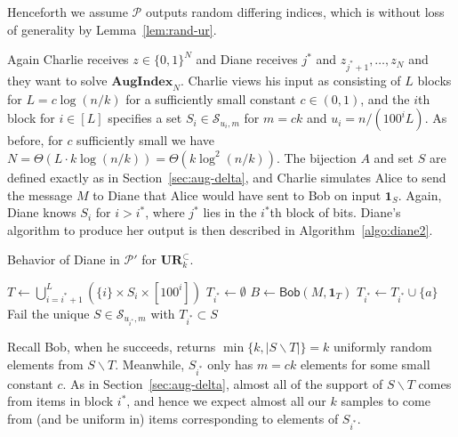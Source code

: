 \documentclass[11pt]{article}
\newcommand{\diane}{\mathsf{Diane}}
\newcommand{\query}{\mathsf{Bob}}
\newcommand{\aug}{\mathbf{AugIndex}\xspace}
\newcommand{\ur}{\mathbf{UR}\xspace}
\begin{document}
Henceforth we assume $\mathcal P$ outputs random differing indices, which is without loss of generality by Lemma~\ref{lem:rand-ur}.


Again Charlie receives $z\in\{0,1\}^N$ and Diane receives $j^*$ and $z_{j^*+1},\ldots,z_N$ and they want to solve $\aug_N$. Charlie views his input as consisting of $L$ blocks for $L = c\log(n/k)$ for a sufficiently small constant $c\in(0,1)$, and the $i$th block for $i\in[L]$ specifies a set $S_i \in \mathcal S_{u_i,m}$ for $m = ck$ and $u_i = n/(100^i L)$. As before, for $c$ sufficiently small we have $N = \Theta(L\cdot k\log(n/k)) = \Theta(k\log^2(n/k))$. The bijection $A$ and set $S$ are defined exactly as in Section~\ref{sec:aug-delta}, and Charlie simulates Alice to send the message $M$ to Diane that Alice would have sent to Bob on input $\mathbf{1}_S$. Again, Diane knows $S_i$ for $i>i^*$, where $j^*$ lies in the $i^*$th block of bits. Diane's algorithm to produce her output is then described in Algorithm~\ref{algo:diane2}.

\begin{algorithm}%
  \caption{Behavior of Diane in $\mathcal P'$ for $\ur_k^\subset$.} \label{algo:diane2}
  \begin{algorithmic}[1]
    \Procedure{$\diane$}{$M$}
    \State $T \leftarrow \bigcup_{i=i^*+1}^L (\{i\} \times S_i \times [100^i])$
    \State $T_{i^*}\leftarrow \emptyset$
    \State $B\leftarrow \query(M, \mathbf{1}_T)$
        \State $T_{i^*} \leftarrow T_{i^*}\cup \{a\}$
      \EndIf
    \EndFor
      \State \Return \textsf{Fail}
    \Else
      \State \Return the unique $S\in \mathcal S_{u_{i^*},m}$ with $T_{i^*}\subset S$ 
    \EndIf
    \EndProcedure
  \end{algorithmic}
\end{algorithm}

Recall Bob, when he succeeds, returns $\min\{k, |S\backslash T|\} = k$ uniformly random elements from $S\backslash T$. Meanwhile, $S_{i^*}$ only has $m = ck$ elements for some small constant $c$. As in Section~\ref{sec:aug-delta}, almost all of the support of $S\backslash T$ comes from items in block $i^*$, and hence we expect almost all our $k$ samples to come from (and be uniform in) items corresponding to elements of $S_{i^*}$. 
\end{document}
